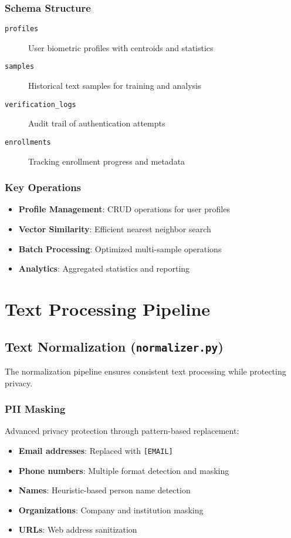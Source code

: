 \documentclass[12pt,a4paper]{article}
\begin{document}
\subsubsection{Schema Structure}
\begin{description}
    \item[\texttt{profiles}] User biometric profiles with centroids and statistics
    \item[\texttt{samples}] Historical text samples for training and analysis
    \item[\texttt{verification\_logs}] Audit trail of authentication attempts
    \item[\texttt{enrollments}] Tracking enrollment progress and metadata
\end{description}

\subsubsection{Key Operations}
\begin{itemize}
    \item \textbf{Profile Management}: CRUD operations for user profiles
    \item \textbf{Vector Similarity}: Efficient nearest neighbor search
    \item \textbf{Batch Processing}: Optimized multi-sample operations
    \item \textbf{Analytics}: Aggregated statistics and reporting
\end{itemize}

\section{Text Processing Pipeline}

\subsection{Text Normalization (\texttt{normalizer.py})}

The normalization pipeline ensures consistent text processing while protecting privacy.

\subsubsection{PII Masking}
Advanced privacy protection through pattern-based replacement:
\begin{itemize}
    \item \textbf{Email addresses}: Replaced with \texttt{[EMAIL]}
    \item \textbf{Phone numbers}: Multiple format detection and masking
    \item \textbf{Names}: Heuristic-based person name detection
    \item \textbf{Organizations}: Company and institution masking
    \item \textbf{URLs}: Web address sanitization
\end{itemize}
\end{document}
